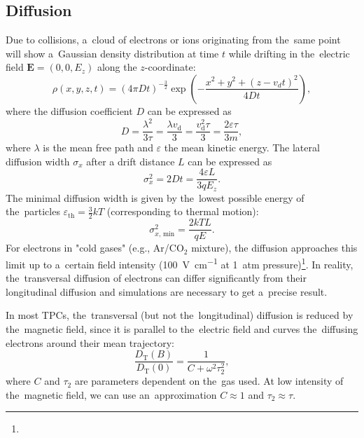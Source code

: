 		\subsection{Diffusion}
			Due to collisions, a~cloud of electrons or ions originating from the~same point will show a~Gaussian density distribution at time $t$ while drifting in the~electric field $\mathbf{E} = (0,0,E_z)$ along the $z$\nobreakdash-coordinate:
				\begin{equation}
					\rho(x,y,z,t) = (4\pi Dt)^{-\frac{3}{2}} \exp\left(-\frac{x^2+y^2+(z-v_dt)^2}{4Dt}\right),
				\end{equation}
			where the diffusion coefficient $D$ can be expressed as
				\begin{equation}
					D = \frac{\lambda^2}{3\tau} = \frac{\lambda v_\text{d}}{3} = \frac{v_\text{d}^2\tau}{3} = \frac{2\varepsilon\tau}{3m},
				\end{equation}
			where $\lambda$ is the mean free path and $\varepsilon$ the mean kinetic energy. The lateral diffusion width $\sigma_x$ after a drift distance $L$ can be expressed as
				\begin{equation}
					\sigma_x^2 = 2Dt = \frac{4\varepsilon L}{3qE_z}.
				\end{equation}
			The minimal diffusion width is given by the~lowest possible energy of the~particles $\varepsilon_\text{th} = \frac{3}{2}kT$ (corresponding to thermal motion):
				\begin{equation}
					\sigma_{x, \,\text{min}}^2 = \frac{2kTL}{qE}.
				\end{equation}
			For electrons in "cold gases" (e.g., Ar/CO$_2$ mixture), the diffusion approaches this limit up to a~certain field intensity (\textapprox\qty{100}{\V\per\cm} at 1~atm pressure)\footnote{}. In reality, the~transversal diffusion of electrons can differ significantly from their longitudinal diffusion and simulations are necessary to get a~precise result.
			
			In most \acp{TPC}, the~transversal (but not the~longitudinal) diffusion is reduced by the~magnetic field, since it is parallel to the~electric field and curves the~diffusing electrons around their mean trajectory:
				\begin{equation}
					\label{eq:difmag}
					\frac{D_\text{T}(B)}{D_\text{T}(0)} = \frac{1}{C+\omega^2\tau_2^2},
				\end{equation}
			where $C$ and $\tau_2$ are parameters dependent on the~gas used. At low intensity of the~magnetic field, we can use an~approximation $C\approx1$ and $\tau_2\approx\tau$.
			

